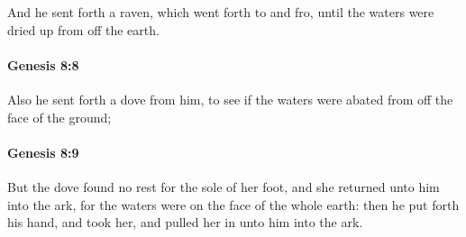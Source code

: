 			And he sent forth a raven, which went forth to and fro, until the waters were dried up from off the earth.


		\paragraph{Genesis 8:8} %
			\label{GENESIS-8-8}

			Also he sent forth a dove from him, to see if the waters were abated from off the face of the ground;


		\paragraph{Genesis 8:9} %
			\label{GENESIS-8-9}

			But the dove found no rest for the sole of her foot, and she returned unto him into the ark, for the waters were on the face of the whole earth: then he put forth his hand, and took her, and pulled her in unto him into the ark.


